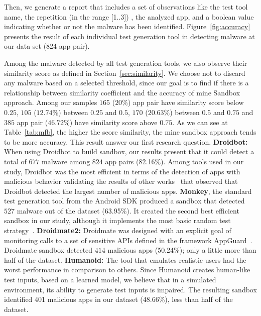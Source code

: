 Then, we generate a report that includes a set of observations like the test tool name, the repetition (in the range [1..3])%
, the analyzed app, and a boolean value indicating whether or not the malware has been identified. Figure~\ref{fig:accuracy} presents the result of each individual test generation tool in detecting malware at our data set (824 app pair).

Among the malware detected by all test generation tools, we also observe their similarity score as defined in Section~\ref{sec:similarity}. We choose  not to discard any malware based on a selected threshold, since our goal is to find if there is a relationship between similarity coefficient and the accuracy of mine Sandbox approach. Among our samples $165$ ($20$\%) app pair have similarity score below $0.25$, $105$ ($12.74$\%) between $0.25$ and $0.5$, $170$ ($20.63$\%) between $0.5$ and $0.75$ and $385$ app pair ($46.72$\%) have similarity score above $0.75$. As we can see at Table~\ref{tab:mfb}, the higher the score similarity, the mine sandbox approach tends to be more accuracy. This result answer our first research question.\newline
\newline
\textbf{Droidbot:} When using Droidbot to build sandbox, our results present that it could detect a total of $677$ malware among $824$ app pairs (82.16\%). Among tools used in our study, Droidbot was the most efficient in terms of the detection of apps with malicious behavior validating the results of other works~\cite{DBLP:conf/wcre/BaoLL18}\cite{DBLP:journals/jss/CostaMMSSBNR22} that observed that Droidbot detected the largest number of malicious apps.\newline
\newline
\textbf{Monkey}, the standard test generation tool from the Android SDK  produced a sandbox that detected $527$ malware out of the dataset (63.95\%). It created the second best efficient sandbox in our study, although it implements the most basic random test strategy~\cite{DBLP:conf/icst/WetzlmaierRP16}\cite{DBLP:conf/kbse/ChoudharyGO15}.\newline
\newline
\textbf{Droidmate2:} Droidmate was designed with an explicit goal of monitoring calls to a set of sensitive APIs defined in the framework AppGuard~\cite{DBLP:conf/esorics/BackesGHMS13}.  Droidmate sandbox detected $414$ malicious apps (50.24\%); only a little more than half of the dataset.\newline
\newline
\textbf{Humanoid:}  The tool that emulates realistic users had the worst performance in comparison to others. Since Humanoid creates human-like test inputs, based on a learned model, we believe that in a simulated environment, its ability to generate test inputs is impaired. The resulting sandbox identified 401 malicious apps in our dataset (48.66\%), less than half of the dataset.

